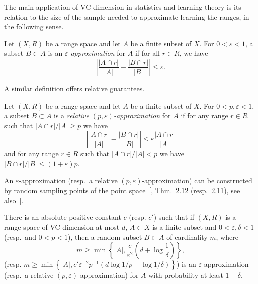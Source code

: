 The main application of VC-dimension in statistics and learning theory is its
relation to the size of the sample needed to approximate learning the ranges, in
the following sense.

\begin{definition}\label{defn:eapprox}
  Let $(X,R)$ be a range space and let $A$
  be a finite subset of $X$. For $0<\varepsilon<1$, a subset $B\subset A$ is an
  $\varepsilon${\em-approximation} for $A$ if for all $r\in R$, we have
      \begin{equation}\label{eq:defeapprox}
	\left|\frac{|A\cap r|}{|A|}-\frac{|B\cap r|}{|B|}\right| \leq
	\varepsilon.
      \end{equation}
\end{definition}

A similar definition offers relative guarantees.
\begin{definition}\label{defn:releapprox}
  Let $(X,R)$ be a range space and let $A$
  be a finite subset of $X$. For $0<p,\varepsilon<1$, a subset $B\subset A$ is a
  \emph{relative} $(p,\varepsilon)$\emph{-approximation} for $A$ if for any
  range $r\in R$ such that $|A\cap r|/|A|\geq p$ we have 
  \[ \left|\frac{|A\cap r|}{|A|}-\frac{|B\cap r|}{|B|}\right| \leq
  \varepsilon\frac{|A\cap r|}{|A|}
  \]
  and for any range $r\in R$ such that $|A\cap r|/|A|< p$ we have $|B\cap
	r|/|B| \leq (1+\varepsilon)p$.
\end{definition}

An $\varepsilon$-approximation (resp.~a relative
$(p,\varepsilon)$-approximation) can be constructed by random sampling points of
the point space~[\cite{HarPS11}, Thm.~2.12 (resp.~2.11), see
also~\citep{LiLS01}].

\begin{theorem}\label{thm:vcmineeapprox}
  There is an absolute positive constant $c$ (resp. $c'$)
  such that if $(X,R)$ is a range-space of VC-dimension at most $d$, $A\subset
  X$ is a finite subset and $0<\varepsilon,\delta<1$ (resp.~and $0<p<1$), then a
  random subset $B\subset A$ of cardinality $m$, where
  \begin{equation}\label{eq:vcmineeapprox}
    m\ge\min\left\{|A|,\frac{c}{\varepsilon^2}\left(d+\log\frac{1}{\delta}\right)\right\},
  \end{equation}
  (resp.
  $m\ge\min\left\{|A|,c'\varepsilon^{-2}p^{-1}\left(d\log1/p-\log1/\delta\right)\right\}$)
  is an $\varepsilon$-approximation (resp.~a relative
  $(p,\varepsilon)$-approximation) for $A$ with probability at least $1-\delta$.
\end{theorem}


